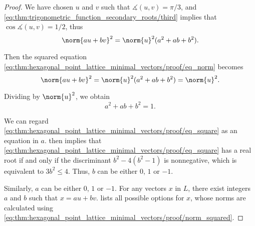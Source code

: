 \begin{proof}
  We have chosen \( u \) and \( v \) such that \( \measuredangle(u, v) = \pi / 3 \), and \eqref{eq:thm:trigonometric_function_secondary_roots/third} implies that \( \cos \measuredangle(u, v) = 1 / 2 \), thus
  \begin{equation}\label{eq:thm:hexagonal_point_lattice_minimal_vectors/proof/norm_squared}
    \norm{au + bv}^2 = \norm{u}^2 (a^2 + ab + b^2).
  \end{equation}

  Then the squared equation \eqref{eq:thm:hexagonal_point_lattice_minimal_vectors/proof/eq_norm} becomes
  \begin{equation*}
    \norm{au + bv}^2 = \norm{u}^2 (a^2 + ab + b^2) = \norm{u}^2.
  \end{equation*}

  Dividing by \( \norm{u}^2 \), we obtain
  \begin{equation}\label{eq:thm:hexagonal_point_lattice_minimal_vectors/proof/eq_square}
    a^2 + ab + b^2 = 1.
  \end{equation}

  We can regard \eqref{eq:thm:hexagonal_point_lattice_minimal_vectors/proof/eq_square} as an equation in \( a \).  then implies that \eqref{eq:thm:hexagonal_point_lattice_minimal_vectors/proof/eq_square} has a real root if and only if the discriminant \( b^2 - 4(b^2 - 1) \) is nonnegative, which is equivalent to \( 3b^2 \leq 4 \). Thus, \( b \) can be either \( 0 \), \( 1 \) or \( -1 \).

  Similarly, \( a \) can be either \( 0 \), \( 1 \) or \( -1 \). For any vectors \( x \) in \( L \), there exist integers \( a \) and \( b \) such that \( x = au + bv \).  lists all possible options for \( x \), whose norms are calculated using \eqref{eq:thm:hexagonal_point_lattice_minimal_vectors/proof/norm_squared}.


\end{proof}
